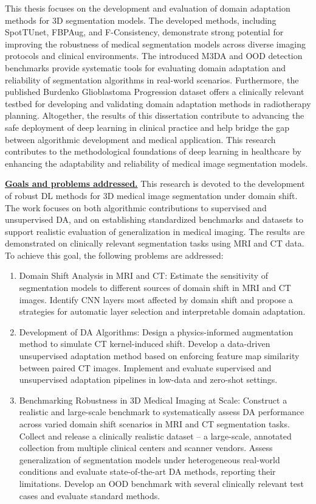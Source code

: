 This thesis focuses on the development and evaluation of domain adaptation methods for 3D segmentation models. The developed methods, including SpotTUnet, FBPAug, and F-Consistency, demonstrate strong potential for improving the robustness of medical segmentation models across diverse imaging protocols and clinical environments. The introduced M3DA and OOD detection benchmarks provide systematic tools for evaluating domain adaptation and reliability of segmentation algorithms in real-world scenarios. Furthermore, the published Burdenko Glioblastoma Progression dataset offers a clinically relevant testbed for developing and validating domain adaptation methods in radiotherapy planning. Altogether, the results of this dissertation contribute to advancing the safe deployment of deep learning in clinical practice and help bridge the gap between algorithmic development and medical application. This research contributes to the methodological foundations of deep learning in healthcare by enhancing the adaptability and reliability of medical image segmentation models.


\underline{\textbf{Goals and problems addressed.}} This research is devoted to the development of robust DL methods for 3D medical image segmentation under domain shift. The work focuses on both algorithmic contributions to supervised and unsupervised DA, and on establishing standardized benchmarks and datasets to support realistic evaluation of generalization in medical imaging. The results are demonstrated on clinically relevant segmentation tasks using MRI and CT data.
To achieve this goal, the following problems are addressed:

\begin{enumerate}
    \item Domain Shift Analysis in MRI and CT: Estimate the sensitivity of segmentation models to different sources of domain shift in MRI and CT images. Identify CNN layers most affected by domain shift and propose a strategies for automatic layer selection and interpretable domain adaptation.
    \item Development of DA Algorithms: Design a physics-informed augmentation method to simulate CT kernel-induced shift. Develop a data-driven unsupervised adaptation method based on enforcing feature map similarity between paired CT images. Implement and evaluate supervised and unsupervised adaptation pipelines in low-data and zero-shot settings.
    \item Benchmarking Robustness in 3D Medical Imaging at Scale: Construct a realistic and large-scale benchmark to systematically assess DA performance across varied domain shift scenarios in MRI and CT segmentation tasks. Collect and release a clinically realistic dataset -- a large-scale, annotated collection from multiple clinical centers and scanner vendors. Assess generalization of segmentation models under heterogeneous real-world conditions and evaluate state-of-the-art DA methods, reporting their limitations. Develop an OOD benchmark with several clinically relevant test cases and evaluate standard methods. %
\end{enumerate}

